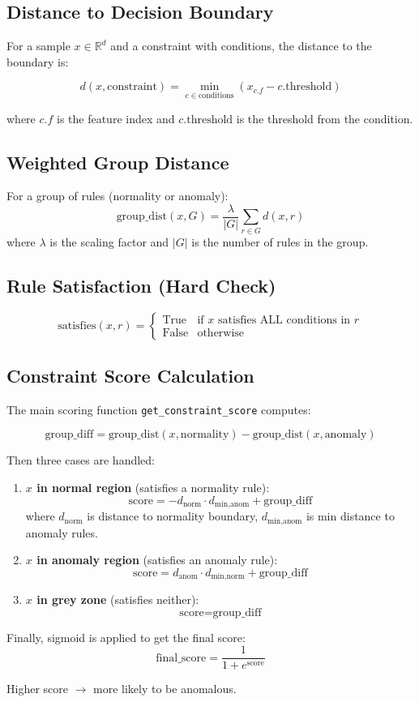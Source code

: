 \subsection{Distance to Decision Boundary}
For a sample $x \in \mathbb{R}^d$ and a constraint with conditions, the distance to the boundary is:

\[
d(x, \text{constraint}) = \min_{c \in \text{conditions}} \left( x_{c.f} - c.\text{threshold} \right)
\]

where $c.f$ is the feature index and $c.\text{threshold}$ is the threshold from the condition.

\subsection{Weighted Group Distance}
For a group of rules (normality or anomaly):
\[
\text{group\_dist}(x, G) = \frac{\lambda}{|G|} \sum_{r \in G} d(x, r)
\]
where $\lambda$ is the scaling factor and $|G|$ is the number of rules in the group.

\subsection{Rule Satisfaction (Hard Check)}
\[
\text{satisfies}(x, r) = \begin{cases}
\text{True} & \text{if } x \text{ satisfies ALL conditions in } r \\
\text{False} & \text{otherwise}
\end{cases}
\]

\subsection{Constraint Score Calculation}
The main scoring function \texttt{get\_constraint\_score} computes:

\[
\text{group\_diff} = \text{group\_dist}(x, \text{normality}) - \text{group\_dist}(x, \text{anomaly})
\]

Then three cases are handled:

\begin{enumerate}
    \item \textbf{$x$ in normal region} (satisfies a normality rule):
    \[
    \text{score} = -d_{\text{norm}} \cdot d_{\text{min,anom}} + \text{group\_diff}
    \]
    where $d_{\text{norm}}$ is distance to normality boundary, $d_{\text{min,anom}}$ is min distance to anomaly rules.
    
    \item \textbf{$x$ in anomaly region} (satisfies an anomaly rule):
    \[
    \text{score} = d_{\text{anom}} \cdot d_{\text{min,norm}} + \text{group\_diff}
    \]
    
    \item \textbf{$x$ in grey zone} (satisfies neither):
    \[
    \text{score} = \text{group\_diff}
    \]
\end{enumerate}

Finally, sigmoid is applied to get the final score:
\[
\text{final\_score} = \frac{1}{1 + e^{\text{score}}}
\]

Higher score $\rightarrow$ more likely to be anomalous.
